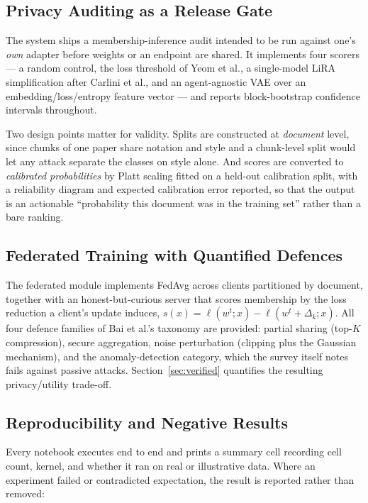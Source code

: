 \documentclass[11pt,a4paper]{article}
\theoremstyle{plain}
\theoremstyle{definition}
\begin{document}
\subsection{Privacy Auditing as a Release Gate}

The system ships a membership-inference audit intended to be run against
one's \emph{own} adapter before weights or an endpoint are shared. It
implements four scorers --- a random control, the loss threshold of Yeom et
al., a single-model LiRA simplification after Carlini et al., and an
agent-agnostic VAE over an embedding/loss/entropy feature vector --- and
reports block-bootstrap confidence intervals throughout.

Two design points matter for validity. Splits are constructed at
\emph{document} level, since chunks of one paper share notation and style and
a chunk-level split would let any attack separate the classes on style alone.
And scores are converted to \emph{calibrated probabilities} by Platt scaling
fitted on a held-out calibration split, with a reliability diagram and
expected calibration error reported, so that the output is an actionable
``probability this document was in the training set'' rather than a bare
ranking.

\subsection{Federated Training with Quantified Defences}

The federated module implements FedAvg across clients partitioned by
document, together with an honest-but-curious server that scores membership
by the loss reduction a client's update induces,
$s(x)=\ell(w^{t};x)-\ell(w^{t}+\Delta_k;x)$. All four defence families of
Bai et al.'s taxonomy are provided: partial sharing (top-$K$ compression),
secure aggregation, noise perturbation (clipping plus the Gaussian
mechanism), and the anomaly-detection category, which the survey itself
notes fails against passive attacks. Section~\ref{sec:verified} quantifies
the resulting privacy/utility trade-off.

\subsection{Reproducibility and Negative Results}

Every notebook executes end to end and prints a summary cell recording cell
count, kernel, and whether it ran on real or illustrative data. Where an
experiment failed or contradicted expectation, the result is reported rather
than removed:
\end{document}
